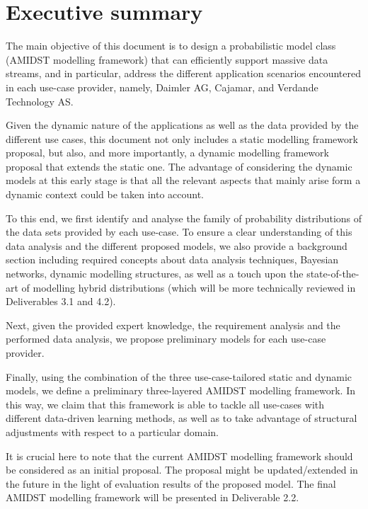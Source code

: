 \section{Executive summary}\label{section:executiveSummary}

The main objective of this document is to design a probabilistic model class (AMIDST modelling framework) that can efficiently support massive data streams, and in particular, address the different application scenarios encountered in each use-case provider, namely, Daimler AG, Cajamar, and Verdande Technology AS. 

Given the dynamic nature of the applications as well as the data provided by the different use cases, this document not only includes a static modelling framework proposal, but also, and more importantly, a dynamic modelling framework proposal that extends the static one. The advantage of considering the dynamic models at this early stage is that all the relevant aspects that mainly arise form a dynamic context could be taken into account.  

To this end, we first identify and analyse the family of probability distributions of the data sets provided by each use-case. To ensure a clear understanding of this data analysis and the different proposed models, we also provide a background section including required concepts about data analysis techniques, Bayesian networks, dynamic modelling structures, as well as a touch upon the state-of-the-art of modelling hybrid distributions (which will be more technically reviewed in Deliverables 3.1 and 4.2).

Next, given the provided expert knowledge, the requirement analysis and the performed data analysis, we propose preliminary models for each use-case provider.

Finally, using the combination of the three use-case-tailored static and dynamic models, we define a preliminary three-layered AMIDST modelling framework. In this way, we claim that this framework is able to tackle all use-cases with different data-driven learning methods, as well as to take advantage of structural adjustments with respect to a particular domain.

It is crucial here to note that the current AMIDST modelling framework should be considered as an initial proposal. The proposal might be updated/extended in the future in the light of evaluation results of the proposed model. The final AMIDST modelling framework will be presented in Deliverable 2.2.


